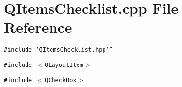 \section{QItems\-Checklist.cpp File Reference}
\label{QItemsChecklist_8cpp}
{\tt \#include \char`\"{}QItems\-Checklist.hpp\char`\"{}}\par
{\tt \#include $<$QLayout\-Item$>$}\par
{\tt \#include $<$QCheck\-Box$>$}\par
